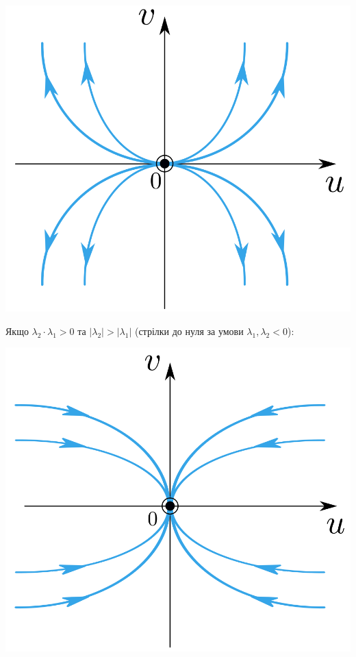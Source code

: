 \documentclass[14pt,a4paper]{scrartcl}
\theoremstyle{definition}
\theoremstyle{definition}
\theoremstyle{definition}
\begin{document}
\begin{center} \includegraphics[scale=0.37]{assets/lectures_recent-b13d607a.png} \end{center}

Якщо $ \lambda_2 \cdot \lambda_1 > 0$ та  $ \left| \lambda_2 \right| > \left| \lambda_1 \right|  $ (стрілки до нуля за умови $
 \lambda_1, \lambda_2 < 0$):

 \begin{center} \includegraphics[scale=0.37]{assets/lectures_recent-392ff5ad.png} \end{center}
\end{document}
